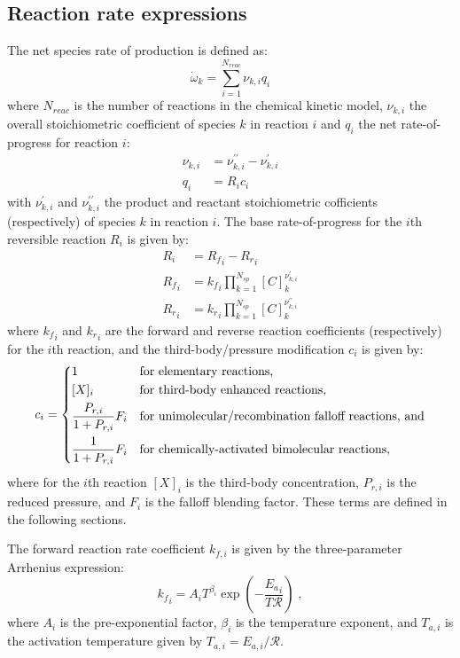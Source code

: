 \documentclass[12pt]{article}
\newcommand{\ns}{\ensuremath{{N_{sp}}}}
\newcommand{\nr}{\ensuremath{{N_{reac}}}}
\newcommand{\Ru}{\ensuremath{\mathcal{R}}}
\begin{document}
\subsection{Reaction rate expressions}
The net species rate of production is defined as:
\begin{equation}
 \label{e:spec_rop}
 \dot{\omega}_{k} = \sum_{i=1}^{\nr} \nu_{k,i} q_{i}
\end{equation}
where $\nr$ is the number of reactions in the chemical kinetic model, $\nu_{k, i}$ the overall stoichiometric coefficient of species $k$ in reaction $i$ and $q_i$ the net rate-of-progress for reaction $i$:
\begin{align}
\nu_{k,i} &= \nu^{\prime\prime}_{k,i} - \nu^{\prime}_{k,i} \\
q_{i} &= R_{i} c_{i}
\end{align}
with $\nu^{\prime}_{k,i}$ and $\nu^{\prime\prime}_{k,i}$ the product and reactant stoichiometric cofficients (respectively) of species $k$ in reaction $i$.
The base rate-of-progress for the $i$th reversible reaction $R_{i}$ is given by:
\begin{align}
R_{i} &= {R_f}_{i} - {R_r}_{i} \label{e:ropnet}\\
{R_f}_{i} &= {k_f}_{i} \prod_{k=1}^{\ns} [C]_{k}^{\nu^{\prime}_{k,i}} \label{e:ropf}\\
{R_r}_{i} &= {k_r}_{i} \prod_{k=1}^{\ns} [C]_{k}^{\nu^{\prime\prime}_{k,i}} \label{e:ropr}
\end{align}
where ${k_f}_{i}$ and ${k_r}_{i}$ are the forward and reverse reaction coefficients (respectively) for the $i$th reaction, and the third-body\slash pressure modification $c_{i}$ is given by:
\begin{equation}
\label{e:rxn_pressure}
c_i = \begin{dcases}
  1 &\text{for elementary reactions,} \\
  [X]_i &\text{for third-body enhanced reactions,} \\
  \frac{P_{r,i}}{1 + P_{r,i}} F_i &\text{for unimolecular/recombination falloff reactions, and} \\
  \frac{1}{1 + P_{r,i}} F_i &\text{for chemically-activated bimolecular reactions,}
  \end{dcases}
\end{equation}
where for the $i$th reaction $[X]_i$ is the third-body concentration, $P_{r,i}$ is the reduced pressure, and $F_i$ is the falloff blending factor.
These terms are defined in the following sections.

The forward reaction rate coefficient $k_{f, i}$ is given by the three-parameter Arrhenius expression:
\begin{equation}
  \label{e:arrhenius}
  {k_f}_{i} = A_{i} T^{\beta_{i}} \operatorname{exp}\left({- \frac{{E_{a}}_{i}}{T \Ru}}\right) \;,
\end{equation}
where $A_i$ is the pre-exponential factor, $\beta_i$ is the temperature exponent, and $T_{a, i}$ is the activation temperature given by $T_{a, i} = E_{a, i} / \mathcal{R}$.
\end{document}
